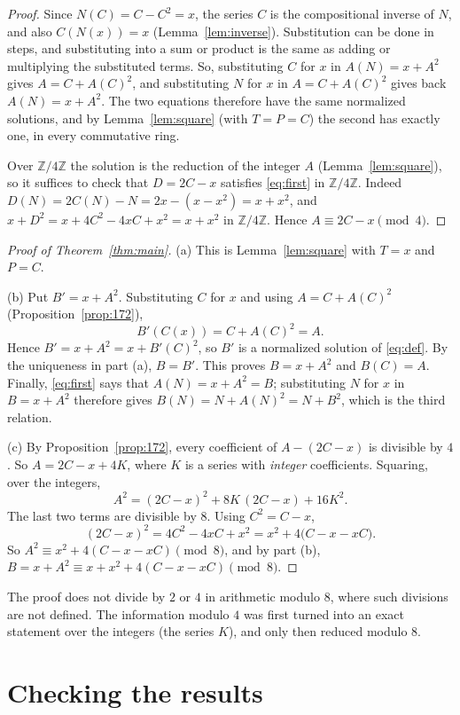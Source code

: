 \documentclass[11pt,a4paper]{article}
\theoremstyle{definition}
\theoremstyle{remark}
\newcommand{\Z}{\mathbb{Z}}
\begin{document}
\begin{proof}
Since $N(C)=C-C^2=x$, the series $C$ is the compositional inverse of $N$, and also $C(N(x))=x$
(Lemma~\ref{lem:inverse}). Substitution can be done in steps, and substituting into a sum or product is the same as
adding or multiplying the substituted terms. So, substituting $C$ for $x$ in $A(N)=x+A^2$ gives $A=C+A(C)^2$, and
substituting $N$ for $x$ in $A=C+A(C)^2$ gives back $A(N)=x+A^2$. The two equations therefore have the same normalized
solutions, and by Lemma~\ref{lem:square} (with $T=P=C$) the second has exactly one, in every commutative ring.

Over $\Z/4\Z$ the solution is the reduction of the integer $A$ (Lemma~\ref{lem:square}), so it suffices to check that
$D=2C-x$ satisfies \eqref{eq:first} in $\Z/4\Z$. Indeed $D(N)=2C(N)-N=2x-(x-x^2)=x+x^2$, and
$x+D^2=x+4C^2-4xC+x^2=x+x^2$ in $\Z/4\Z$. Hence $A\equiv2C-x\pmod4$.
\end{proof}

\begin{proof}[Proof of Theorem~\ref{thm:main}]
(a) This is Lemma~\ref{lem:square} with $T=x$ and $P=C$.

(b) Put $B'=x+A^2$. Substituting $C$ for $x$ and using $A=C+A(C)^2$ (Proposition~\ref{prop:172}),
\[
B'(C(x))=C+A(C)^2=A .
\]
Hence $B'=x+A^2=x+B'(C)^2$, so $B'$ is a normalized solution of \eqref{eq:def}. By the uniqueness in part (a), $B=B'$.
This proves $B=x+A^2$ and $B(C)=A$. Finally, \eqref{eq:first} says that $A(N)=x+A^2=B$; substituting $N$ for $x$ in
$B=x+A^2$ therefore gives $B(N)=N+A(N)^2=N+B^2$, which is the third relation.

(c) By Proposition~\ref{prop:172}, every coefficient of $A-(2C-x)$ is divisible by $4$. So $A=2C-x+4K$, where $K$ is a
series with \emph{integer} coefficients. Squaring, over the integers,
\[
A^2=(2C-x)^2+8K\,(2C-x)+16K^2 .
\]
The last two terms are divisible by $8$. Using $C^2=C-x$,
\[
(2C-x)^2=4C^2-4xC+x^2=x^2+4\bigl(C-x-xC\bigr).
\]
So $A^2\equiv x^2+4(C-x-xC)\pmod8$, and by part (b), $B=x+A^2\equiv x+x^2+4(C-x-xC)\pmod8$.
\end{proof}

The proof does not divide by $2$ or $4$ in arithmetic modulo $8$, where such divisions are not defined. The
information modulo $4$ was first turned into an exact statement over the integers (the series $K$), and only then reduced modulo $8$.

\section{Checking the results}\label{sec:checks}
\end{document}
